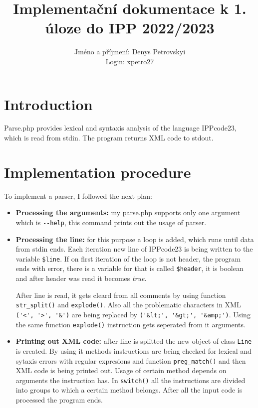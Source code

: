\documentclass[10pt, a4paper]{article}
\title{Implementační dokumentace k 1. úloze do IPP 2022/2023}
\author{Jméno a příjmení: Denys Petrovskyi\\ Login: xpetro27}
\date{}
\begin{document}
\maketitle
\section{Introduction}

Parse.php provides lexical and syntaxis analysis of the language IPPcode23, which is read from stdin.
The program returns XML code to stdout.

\section{Implementation procedure}
To implement a parser, I followed the next plan:

\begin{itemize}
    \item \textbf{Processing the arguments:} my parse.php supports only one argument which is \verb|--help|,
    this command prints out the usage of parser.
    \item \textbf{Processing the line:} for this purpose a loop is added, which runs until data from stdin ends.
    Each iteration new line of IPPcode23 is being written to the variable \verb|$line|. If on first iteration of the loop
    is not header, the program ends with error, there is a variable for that is called \verb|$header|, it is boolean
    and after header was read it becomes \emph{true}.
    \par After line is read, it gets cleard from all comments by using function \verb|str_split()| and \verb|explode()|.
    Also all the problematic characters in XML \verb|('<', '>', '&')| are being replaced by \verb|('&lt;', '&gt;', '&amp;')|.
    Using the same function \verb|explode()| instruction gets seperated from it arguments.
    \item \textbf{Printing out XML code:} after line is splitted the new object of class \verb|Line| is created.
    By using it methods instructions are being checked for lexical and sytaxis errors with regular expresions and function \verb|preg_match()|
    and then XML code is being printed out. Usage of certain method depends on arguments the instruction has.
    In \verb|switch()| all the instructions are divided into groups to which a certain method belongs.
    After all the input code is processed the program ends.

\end{itemize}
\end{document}
